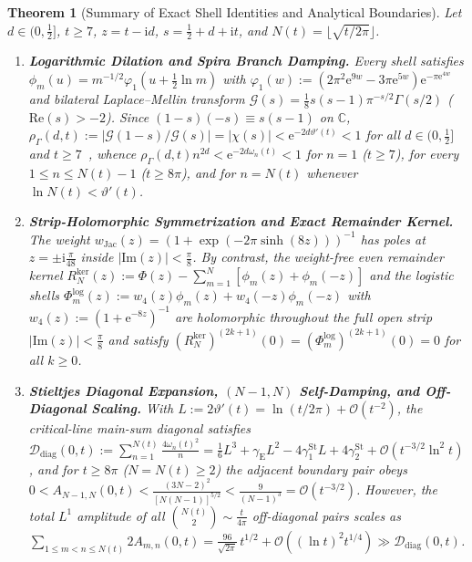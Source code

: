 \documentclass[11pt,reqno]{amsart}
\newtheorem{theorem}{Theorem}[section]
\theoremstyle{definition}
\theoremstyle{remark}
\numberwithin{equation}{section}
\newcommand{\C}{\mathbb{C}}
\newcommand{\ii}{\mathrm{i}}
\newcommand{\ee}{\mathrm{e}}
\newcommand{\Rea}{\mathrm{Re}}
\newcommand{\Ima}{\mathrm{Im}}
\begin{document}
\begin{theorem}[Summary of Exact Shell Identities and Analytical Boundaries]\label{thm:main_summary}
Let $d \in (0, \frac{1}{2}]$, $t \ge 7$, $z = t - \ii d$, $s = \frac{1}{2} + d + \ii t$, and $N(t) = \lfloor\sqrt{t/2\pi}\rfloor$.
\begin{enumerate}[label=\textup{(\roman*)},leftmargin=2.2em]
\item \textbf{Logarithmic Dilation and Spira Branch Damping.} Every shell satisfies $\phi_m(u) = m^{-1/2}\varphi_1(u + \frac{1}{2}\ln m)$ with $\varphi_1(w) := (2\pi^2\ee^{9w} - 3\pi\ee^{5w})\ee^{-\pi\ee^{4w}}$ and bilateral Laplace--Mellin transform $\mathcal{G}(s) = \frac{1}{8}s(s-1)\pi^{-s/2}\Gamma(s/2)$ ($\Rea(s) > -2$). Since $(1-s)(-s) \equiv s(s-1)$ on $\C$, $\rho_\Gamma(d,t) := \lvert\mathcal{G}(1-s)/\mathcal{G}(s)\rvert = \lvert\chi(s)\rvert < \ee^{-2d\vartheta'(t)} < 1$ for all $d \in (0, \frac{1}{2}]$ and $t \ge 7$~\cite{spira1965,saidakzvengrowski2003}, whence $\rho_\Gamma(d,t)n^{2d} < \ee^{-2d\omega_n(t)} < 1$ for $n = 1$ ($t \ge 7$), for every $1 \le n \le N(t) - 1$ ($t \ge 8\pi$), and for $n = N(t)$ whenever $\ln N(t) < \vartheta'(t)$.
\item \textbf{Strip-Holomorphic Symmetrization and Exact Remainder Kernel.} The weight $w_{\mathrm{Jac}}(z) = (1 + \exp(-2\pi\sinh(8z)))^{-1}$ has poles at $z = \pm\ii\frac{\pi}{48}$ inside $\lvert\Ima(z)\rvert < \frac{\pi}{8}$. By contrast, the weight-free even remainder kernel $R_N^{\mathrm{ker}}(z) := \Phi(z) - \sum_{m=1}^N [\phi_m(z) + \phi_m(-z)]$ and the logistic shells $\Phi_m^{\mathrm{log}}(z) := w_4(z)\phi_m(z) + w_4(-z)\phi_m(-z)$ with $w_4(z) := (1 + \ee^{-8z})^{-1}$ are holomorphic throughout the full open strip $\lvert\Ima(z)\rvert < \frac{\pi}{8}$ and satisfy $(R_N^{\mathrm{ker}})^{(2k+1)}(0) = (\Phi_m^{\mathrm{log}})^{(2k+1)}(0) = 0$ for all $k \ge 0$.
\item \textbf{Stieltjes Diagonal Expansion, $(N-1,N)$ Self-Damping, and Off-Diagonal Scaling.} With $L := 2\vartheta'(t) = \ln(t/2\pi) + \mathcal{O}(t^{-2})$, the critical-line main-sum diagonal satisfies $\mathcal{D}_{\mathrm{diag}}(0,t) := \sum_{n=1}^{N(t)} \frac{4\omega_n(t)^2}{n} = \frac{1}{6}L^3 + \gamma_{\mathrm{E}}L^2 - 4\gamma_1^{\mathrm{St}}L + 4\gamma_2^{\mathrm{St}} + \mathcal{O}(t^{-3/2}\ln^2 t)$, and for $t \ge 8\pi$ ($N = N(t) \ge 2$) the adjacent boundary pair obeys $0 < A_{N-1,N}(0,t) < \frac{(3N-2)^2}{[N(N-1)]^{5/2}} < \frac{9}{(N-1)^3} = \mathcal{O}(t^{-3/2})$. However, the total $L^1$ amplitude of all $\binom{N(t)}{2} \sim \frac{t}{4\pi}$ off-diagonal pairs scales as $\sum_{1 \le m < n \le N(t)} 2A_{m,n}(0,t) = \frac{96}{\sqrt{2\pi}}\,t^{1/2} + \mathcal{O}((\ln t)^2 t^{1/4}) \gg \mathcal{D}_{\mathrm{diag}}(0,t)$.

\end{enumerate}
\end{theorem}
\end{document}
